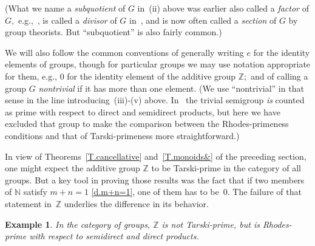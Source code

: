 \documentclass{amsart}
\newtheorem{example}[theorem]{Example}
\numberwithin{equation}{section}
\numberwithin{theorem}{section}
\newcommand{\N}{\mathbb{N}}
\newcommand{\Z}{\mathbb{Z}}
\begin{document}
(What we name a {\em subquotient} of $G$ in~(ii) above was earlier
also called a {\em factor} of $G,$ e.g.,~\cite[p.\,1 et seq.]{HN},
is called a {\em divisor} of $G$ in~\cite[Def.~1.2.25, p.\,32]{RS},
and is now often called a {\em section} of $G$ by group theorists.
But ``subquotient'' is also fairly common.)

We will also follow the common conventions of
generally writing $e$ for the
identity elements of groups, though for particular groups we may use
notation appropriate for them, e.g., $0$ for
the identity element of the additive group $\Z;$ and of
calling a group $G$ {\em nontrivial} if it has more than one element.
(We use ``nontrivial'' in that sense
in the line introducing~(iii)-(v) above.
In~\cite{RS} the trivial semigroup {\em is} counted as prime
with respect to direct and semidirect products,
but here we have excluded that group to make the comparison
between the Rhodes-primeness conditions
and that of Tarski-primeness more straightforward.)

In view of Theorems~\ref{T.cancellative} and~\ref{T.monoids&}
of the preceding section,
one might expect the additive group $\Z$ to be Tarski-prime
in the category of all groups.
But a key tool in proving those results was the fact that
if two members of $\N$ satisfy $m+n=1$ \eqref{d.m+n=1},
one of them has to be~$0.$
The failure of that statement in~$\Z$ underlies the difference
in its behavior.

\begin{example}\label{E.Z}
In the category of groups, $\Z$ is not Tarski-prime,
but {\em is} Rhodes-prime with respect to semidirect and
direct products.
\end{example}
\end{document}
